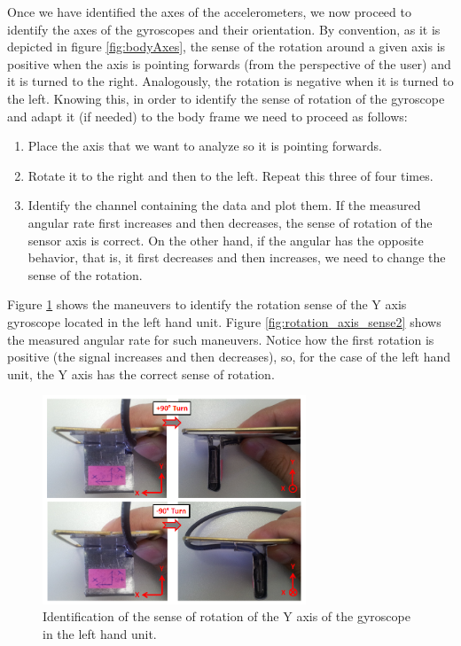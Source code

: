 \indent Once we have identified the axes of the accelerometers, we now proceed to identify the axes of the gyroscopes and their orientation. By convention, as it is depicted in figure \ref{fig:bodyAxes}, the sense of the rotation around a given axis is positive when the axis is pointing forwards (from the perspective of the user) and it is turned to the right. Analogously, the rotation is negative when it is turned to the left. Knowing this, in order to identify the sense of rotation of the gyroscope and adapt it (if needed) to the body frame we need to proceed as follows:
\begin{enumerate}
\item Place the axis that we want to analyze so it is pointing forwards.
\item Rotate it to the right and then to the left. Repeat this three of four times. 
\item Identify the channel containing the data and plot them. If the measured angular rate first increases and then decreases, the sense of rotation of the sensor axis is correct. On the other hand, if the angular has the opposite behavior, that is, it first decreases and then increases, we need to change the sense of the rotation. 
\end{enumerate}
Figure \ref{fig:rotation_axis_sense1} shows the maneuvers to identify the rotation sense of the Y axis gyroscope located in the left hand unit. Figure \ref{fig:rotation_axis_sense2} shows the measured angular rate for such maneuvers. Notice how the first rotation is positive (the signal increases and then decreases), so, for the case of the left hand unit, the Y axis has the correct sense of rotation.

\begin{figure}[H]
\centering
\includegraphics[width=0.7\textwidth]{figures/gyro_axis_ID.png}
\caption{Identification of the sense of rotation of the Y axis of the gyroscope in the left hand unit.}
\label{fig:rotation_axis_sense1}
\end{figure}

